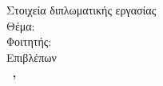 \pagestyle{empty}
\hspace{10pt}
\begin{center}
\Large{Στοιχεία διπλωματικής εργασίας}\\[1cm]
{\large Θέμα:}
\textbf{\large \doctitle}\\[1cm]
\large {Φοιτητής: \textbf{\nomme}}\\[1cm]
\large{Επιβλέπων}\\
\textbf{\suptitle \, \supname , \supuni}\\[1cm]

\end{center}

\vspace{5em}


